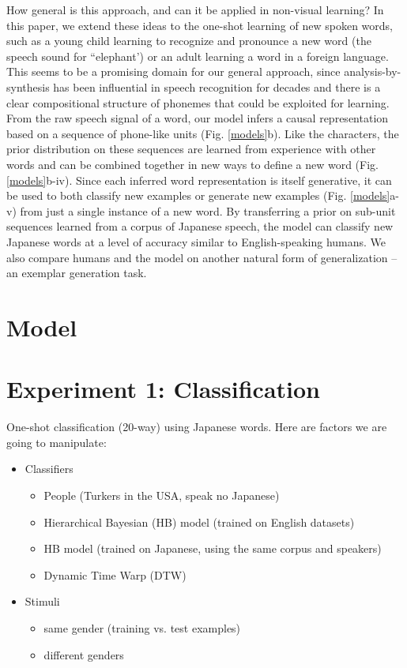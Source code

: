 \documentclass[10pt,letterpaper]{article}
\begin{document}
How general is this approach, and can it be applied in non-visual learning? In this paper, we extend these ideas to the one-shot learning of new spoken words, such as a young child learning to recognize and pronounce a new word (the speech sound for ``elephant') or an adult learning a word in a foreign language. This seems to be a promising domain for our general approach, since analysis-by-synthesis has been influential in speech recognition for decades \cite{Halle1962,Liberman1967} and there is a clear compositional structure of phonemes that could be exploited for learning. From the raw speech signal of a word, our model infers a causal representation based on a sequence of phone-like units (Fig. \ref{models}b). Like the characters, the prior distribution on these sequences are learned from experience with other words and can be combined together in new ways to define a new word (Fig. \ref{models}b-iv). Since each inferred word representation is itself generative, it can be used to both classify new examples or generate new examples (Fig. \ref{models}a-v) from just a single instance of a new word. By transferring a prior on sub-unit sequences learned from a corpus of Japanese speech, the model can classify new Japanese words at a level of accuracy similar to English-speaking humans. We also compare humans and the model on another natural form of generalization -- an exemplar generation task.

\section{Model}

\section{Experiment 1: Classification}

One-shot classification (20-way) using Japanese words. Here are factors we are going to manipulate:
\begin{itemize}

\item Classifiers
\begin{itemize}
	\item People (Turkers in the USA, speak no Japanese)
	\item Hierarchical Bayesian (HB) model (trained on English datasets)
	\item HB model (trained on Japanese, using the same corpus and speakers)
	\item Dynamic Time Warp (DTW)
\end{itemize}

\item Stimuli
\begin{itemize}
	\item same gender (training vs. test examples)
	\item different genders
\end{itemize}

\end{itemize}
\end{document}
